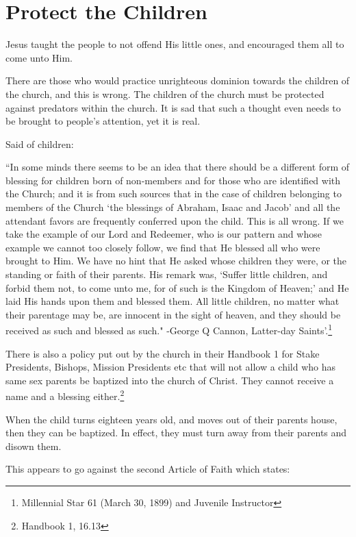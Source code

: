 \chapter{Protect the Children}

Jesus taught the people to not offend His little ones, and encouraged them all to
come unto Him.

There are those who would practice unrighteous dominion towards the children of the
church, and this is wrong. The children of the church must be protected against
predators within the church. It is sad that such a thought even needs to be brought
to people's attention, yet it is real.

Said of children:

\begin{displayquote}
``In some minds there seems to be an idea that there should be a different form of
blessing for children born of non-members and for those who are identified with the
Church; and it is from such sources that in the case of children belonging to members
of the Church `the blessings of Abraham, Isaac and Jacob' and all the attendant
favors are frequently conferred upon the child. This is all wrong. If we take the
example of our Lord and Redeemer, who is our pattern and whose example we cannot too
closely follow, we find that He blessed all who were brought to Him. We have no hint
that He asked whose children they were, or the standing or faith of their parents.
His remark was, `Suffer little children, and forbid them not, to come unto me, for of
such is the Kingdom of Heaven;' and He laid His hands upon them and blessed them. All
little children, no matter what their parentage may be, are innocent in the sight of
heaven, and they should be received as such and blessed as such." -George Q Cannon,
Latter-day Saints'.\footnote{Millennial Star 61 (March 30, 1899) and Juvenile
Instructor}
\end{displayquote}

There is also a policy put out by the church in their Handbook 1 for Stake
Presidents, Bishops, Mission Presidents etc that will not allow a child who has same
sex parents be baptized into the church of Christ. They cannot receive a name and a
blessing either.\footnote{Handbook 1, 16.13}

When the child turns eighteen years old, and moves out of their parents house, then
they can be baptized. In effect, they must turn away from their parents and disown
them.

This appears to go against the second Article of Faith which states:

